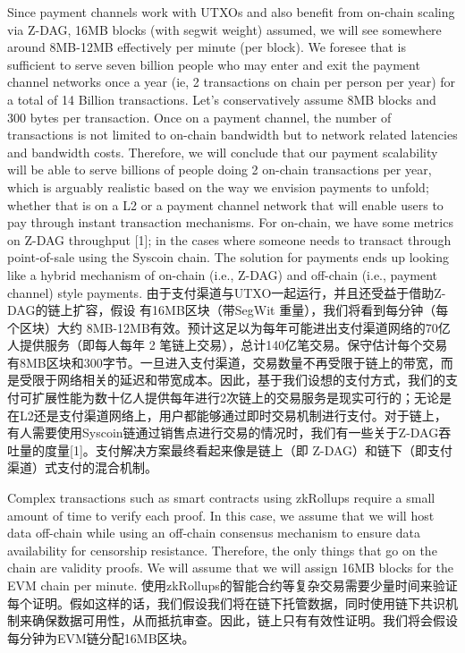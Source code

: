 \documentclass{ctexart}
\begin{document}
Since payment channels work with UTXOs and also benefit from on-chain scaling via Z-DAG, 16MB blocks (with segwit weight) assumed, we will see somewhere around 8MB-12MB effectively per minute (per block). We foresee that is sufficient to serve seven billion people who may enter and exit the payment channel networks once a year (ie, 2 transactions on chain per person per year) for a total of 14 Billion transactions. Let’s conservatively assume 8MB blocks and 300 bytes per transaction. Once on a payment channel, the number of transactions is not limited to on-chain bandwidth but to network related latencies and bandwidth costs. Therefore, we will conclude that our payment scalability will be able to serve billions of people doing 2 on-chain transactions per year, which is arguably realistic based on the way we envision payments to unfold; whether that is on a L2 or a payment channel network that will enable users to pay through instant transaction mechanisms. For on-chain, we have some metrics on Z-DAG throughput [1]; in the cases where someone needs to transact through point-of-sale using the Syscoin chain. The solution for payments ends up looking like a hybrid mechanism of on-chain (i.e., Z-DAG) and off-chain (i.e., payment channel) style payments. 由于支付渠道与UTXO一起运行，并且还受益于借助Z-DAG的链上扩容，假设 有16MB区块（带SegWit 重量），我们将看到每分钟（每个区块）大约 8MB-12MB有效。预计这足以为每年可能进出支付渠道网络的70亿人提供服务（即每人每年 2 笔链上交易），总计140亿笔交易。保守估计每个交易有8MB区块和300字节。一旦进入支付渠道，交易数量不再受限于链上的带宽，而是受限于网络相关的延迟和带宽成本。因此，基于我们设想的支付方式，我们的支付可扩展性能为数十亿人提供每年进行2次链上的交易服务是现实可行的；无论是在L2还是支付渠道网络上，用户都能够通过即时交易机制进行支付。对于链上，有人需要使用Syscoin链通过销售点进行交易的情况时，我们有一些关于Z-DAG吞吐量的度量[1]。支付解决方案最终看起来像是链上（即 Z-DAG）和链下（即支付渠道）式支付的混合机制。

Complex transactions such as smart contracts using zkRollups require a small amount of time to verify each proof. In this case, we assume that we will host data off-chain while using an off-chain consensus mechanism to ensure data availability for censorship resistance. Therefore, the only things that go on the chain are validity proofs. We will assume that we will assign 16MB blocks for the EVM chain per minute. 使用zkRollups的智能合约等复杂交易需要少量时间来验证每个证明。假如这样的话，我们假设我们将在链下托管数据，同时使用链下共识机制来确保数据可用性，从而抵抗审查。因此，链上只有有效性证明。我们将会假设每分钟为EVM链分配16MB区块。
\end{document}
